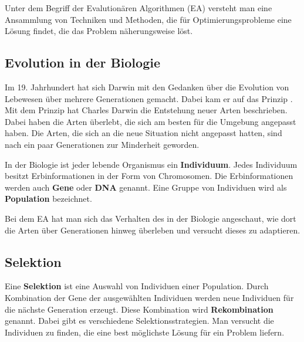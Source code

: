 
Unter dem Begriff der Evalution{\"a}ren Algorithmen (EA) versteht man eine Ansammlung von Techniken und Methoden, die f{\"u}r Optimierungsprobleme eine L{\"o}sung findet, die das Problem n{\"a}herungsweise l{\"o}st. \cite{weicker2015evolutionare} 


\subsection{Evolution in der Biologie}
Im 19. Jahrhundert hat sich Darwin mit den Gedanken {\"u}ber die Evolution von Lebewesen {\"u}ber mehrere Generationen gemacht. Dabei kam er auf das Prinzip . Mit dem Prinzip hat Charles Darwin die Entstehung neuer Arten beschrieben. Dabei haben die Arten {\"u}berlebt, die sich am besten f{\"u}r die Umgebung angepasst haben. Die Arten, die sich an die neue Situation nicht angepasst hatten, sind nach ein paar Generationen zur Minderheit geworden. \cite{hunermann2007brockhaus}

In der Biologie ist jeder lebende Organismus ein \textbf{Individuum}.
Jedes Individuum besitzt Erbinformationen in der Form von Chromosomen. Die Erbinformationen werden auch \textbf{Gene} oder \textbf{DNA} genannt. 
Eine Gruppe von Individuen wird als \textbf{Population} bezeichnet. 

Bei dem EA hat man sich das Verhalten des in der Biologie angeschaut, wie dort die Arten {\"u}ber Generationen hinweg {\"u}berleben und versucht dieses zu adaptieren. \cite{flickevolutionare}

\subsection{Selektion}

Eine \textbf{Selektion} ist eine Auswahl von Individuen einer Population. Durch Kombination der Gene der ausgew{\"a}hlten Individuen werden neue Individuen f{\"u}r die n{\"a}chste Generation erzeugt. Diese Kombination wird \textbf{Rekombination} genannt.
Dabei gibt es verschiedene Selektionsstrategien. Man versucht die Individuen zu finden, die eine best m{\"o}glichste L{\"o}sung f{\"u}r ein Problem liefern. \cite{weicker2015evolutionare, flickevolutionare}


